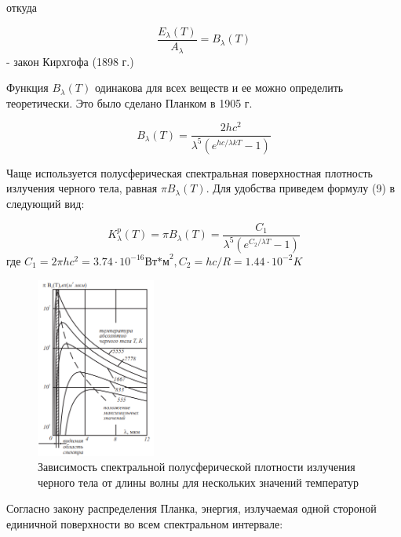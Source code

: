 \documentclass[12pt,a4paper]{article}
\begin{document}
откуда

\begin{equation}
\frac{E_{\lambda}(T)}{A_{\lambda}} = B_{\lambda}(T)
\end{equation}
- закон Кирхгофа (1898 г.)

\par Функция $B_{\lambda}(T)$ одинакова для всех веществ и ее можно определить теоретически. Это было сделано Планком в 1905 г.

\begin{equation}
B_{\lambda}(T) = \frac{2hc^2}{\lambda^5(e^{hc/{\lambda}kT}-1)}
\end{equation}

\par Чаще используется полусферическая спектральная поверхностная плотность излучения черного тела, равная ${\pi}B_{\lambda}(T)$. Для удобства приведем формулу (9) в следующий вид:

\begin{equation}
K_{\lambda}^p(T) = {\pi}B_{\lambda}(T) = \frac{C_1}{\lambda^5(e^{C_2/{\lambda}T}-1)}
\end{equation}
где $C_1 = 2{\pi}hc^2 = 3.74\cdot10^{-16}\text{Вт*м}^2, C_2 = hc/R = 1.44\cdot10^{-2}K$

\begin{figure}[h!]
	\begin{center}
		\includegraphics[width = 0.35\textwidth]{MSS-1-1}
		\caption{Зависимость спектральной полусферической плотности излучения черного тела от длины волны для нескольких значений температур}
	\end{center}
\end{figure}

\par Согласно закону распределения Планка, энергия, излучаемая одной стороной единичной поверхности во всем спектральном интервале:
\end{document}
